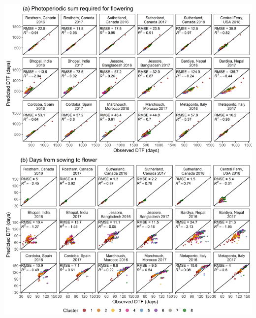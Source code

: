 \documentclass[
]{article}
\begin{document}
\includegraphics{Supplemental_Figure_11.png}
\end{document}
